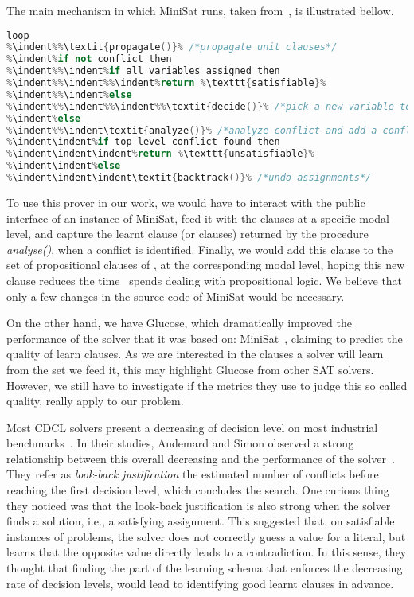 The main mechanism in which MiniSat runs, taken from~\cite{een2003extensible},
is illustrated bellow.

\begin{lstlisting}[frame=single, language=C++,morekeywords={var,loop,then,lit},escapechar=\%,
commentstyle=\color{gray},deletekeywords={not}]
loop
%\indent%%\textit{propagate()}% /*propagate unit clauses*/
%\indent%if not conflict then
%\indent%%\indent%if all variables assigned then
%\indent%%\indent%%\indent%return %\texttt{satisfiable}%
%\indent%%\indent%else
%\indent%%\indent%%\indent%%\textit{decide()}% /*pick a new variable to assign a value*/ 
%\indent%else
%\indent%%\indent\textit{analyze()}% /*analyze conflict and add a conflict clause*/
%\indent\indent%if top-level conflict found then
%\indent\indent\indent%return %\texttt{unsatisfiable}%
%\indent\indent%else
%\indent\indent\indent\textit{backtrack()}% /*undo assignments*/
\end{lstlisting}

To use this prover in our work, we would have to interact with the public
interface of an instance of MiniSat, feed it with the clauses at a specific
modal level, and capture the learnt clause (or clauses) returned by the
procedure \textit{analyse\.()}, when a conflict is identified. Finally, we would
add this clause to the set of propositional clauses of \ksp, at the
corresponding modal level, hoping this new clause reduces the time \ksp~spends
dealing with propositional logic. We believe that only a few changes in the
source code of MiniSat would be necessary.

On the other hand, we have Glucose, which dramatically improved the performance
of the solver that it was based on: MiniSat~\cite{glucose}, claiming to predict
the quality of learn clauses. As we are interested in the clauses a solver will
learn from the set we feed it, this may highlight Glucose from other SAT
solvers. However, we still have to investigate if the metrics they use to judge
this so called quality, really apply to our problem. 

Most CDCL solvers present a decreasing of decision level on most industrial
benchmarks~\cite{audemard2009predicting}. In their studies, Audemard and Simon
observed a strong relationship between this overall decreasing and the
performance of the solver~\cite{audemard2009predicting}. They refer as
\emph{look-back justification} the estimated number of conflicts before reaching
the first decision level, which concludes the search. One curious thing they
noticed was that the look-back justification is also strong when the solver
finds a solution, i.e., a satisfying assignment. This suggested that, on
satisfiable instances of problems, the solver does not correctly guess a value
for a literal, but learns that the opposite value directly leads to a
contradiction. In this sense, they thought that finding the part of the learning
schema that enforces the decreasing rate of decision levels, would lead to
identifying good learnt clauses in advance.

